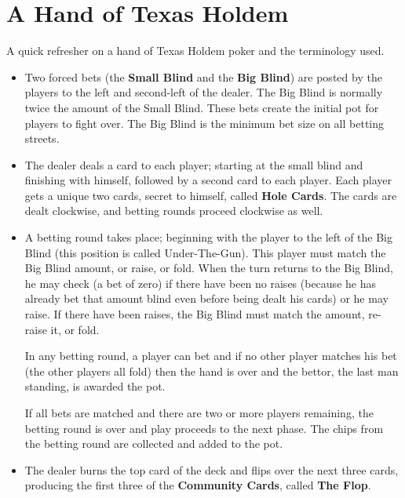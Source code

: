 \chapter{A Hand of Texas Holdem}


A quick refresher on a hand of Texas Holdem poker and the terminology
used.

\begin{itemize}

\item Two forced bets (the \textbf{Small Blind} and the \textbf{Big
  Blind}) are posted by the players to the left and second-left of
  the dealer. The Big Blind is normally twice the amount of the
  Small Blind. These bets create the initial pot for players to
  fight over. The Big Blind is the minimum bet size on all betting streets.
  
\item The dealer deals a card to each player; starting at the small
  blind and finishing with himself, followed by a second card to each
  player. Each player gets a unique two cards, secret to himself,
  called \textbf{Hole Cards}. The cards are dealt clockwise, and
  betting rounds proceed clockwise as well.
  
\item A betting round takes place; beginning with the player to the
  left of the Big Blind (this position is called Under-The-Gun). This
  player must match the Big Blind amount, or raise, or fold. When the
  turn returns to the Big Blind, he may check (a bet of zero) if there
  have been no raises (because he has already bet that amount blind
  even before being dealt his cards) or he may raise. If there have
  been raises, the Big Blind must match the amount, re-raise it, or
  fold.

  In any betting round, a player can bet and if no other player
  matches his bet (the other players all fold) then the hand is over
  and the bettor, the last man standing, is awarded the pot.

  If all bets are matched and there are two or more players remaining,
  the betting round is over and play proceeds to the next phase.
  The chips from the betting round are collected and added to the pot.

\item The dealer burns the top card of the deck and flips over the
  next three cards, producing the first three of the \textbf{Community
  Cards}, called \textbf{The Flop}.


\end{itemize}
